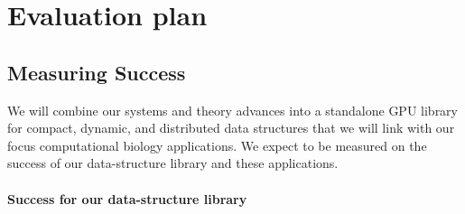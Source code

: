 \section{Evaluation plan}


\subsection{Measuring Success} We will combine our systems and theory advances into a standalone GPU library for compact, dynamic, and distributed data structures that we will link with our focus computational biology applications. We expect to be measured on the success of our data-structure library and these applications.

\noindent
\paragraph{Success for our data-structure library}


\label{sec:sw-methodology}

